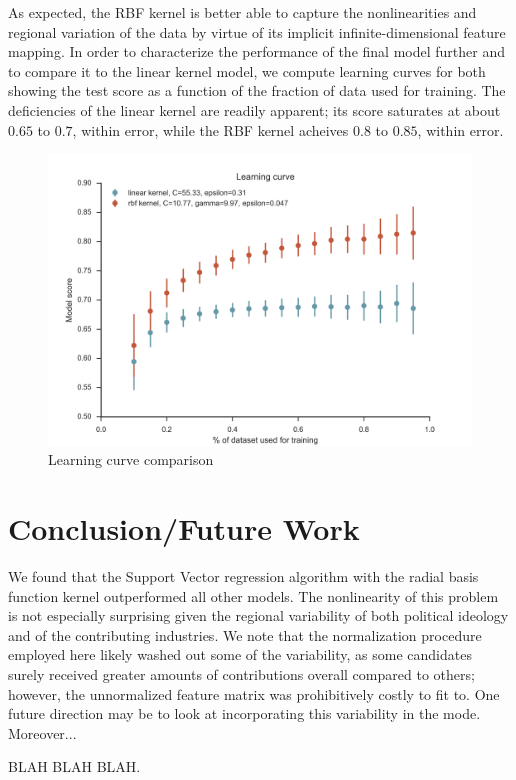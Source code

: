 \documentclass[12]{article}
\begin{document}
\noindent As expected, the RBF kernel is better able to capture the nonlinearities and regional variation of the data by virtue of its implicit infinite-dimensional feature mapping. In order to characterize the performance of the final model further and to compare it to the linear kernel model, we compute learning curves for both showing the test score as a function of the fraction of data used for training. The deficiencies of the linear kernel are readily apparent; its score saturates at about $0.65$ to $0.7$, within error, while the RBF kernel acheives $0.8$ to $0.85$, within error. 

\begin{figure}[H]
\begin{center}
\includegraphics[width=0.8\linewidth]{learning_curve.png}
\caption{Learning curve comparison}
\end{center}
\end{figure}


\section*{Conclusion/Future Work}


\noindnet We found that the Support Vector regression algorithm with the radial basis function kernel outperformed all other models. The nonlinearity of this problem is not especially surprising given the regional variability of both political ideology and of the contributing industries. We note that the normalization procedure employed here likely washed out some of the variability, as some candidates surely received greater amounts of contributions overall compared to others; however, the unnormalized feature matrix was prohibitively costly to fit to. One future direction may be to look at incorporating this variability in the mode. Moreover...

BLAH BLAH BLAH. \\

\printbibliography
\end{document}
